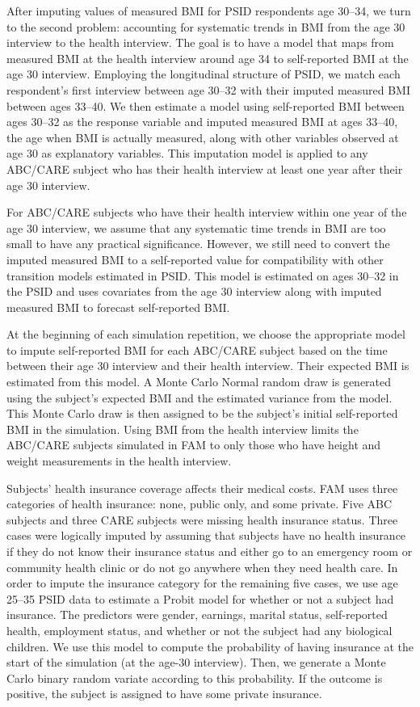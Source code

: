 \noindent After imputing values of measured BMI for PSID respondents age 30--34, we turn to the second problem: accounting for systematic trends in BMI from the age 30 interview to the health interview. The goal is to have a model that maps from measured BMI at the health interview around age 34 to self-reported BMI at the age 30 interview. Employing the longitudinal structure of PSID, we match each respondent's first interview between age 30--32 with their imputed measured BMI between ages 33--40. We then estimate a model using self-reported BMI between ages 30--32 as the response variable and imputed measured BMI at ages 33--40, the age when BMI is actually measured, along with other variables observed at age 30 as explanatory variables. This imputation model is applied to any ABC/CARE subject who has their health interview at least one year after their age 30 interview.

\noindent For ABC/CARE subjects who have their health interview within one year of the age 30 interview, we assume that any systematic time trends in BMI are too small to have any practical significance. However, we still need to convert the imputed measured BMI to a self-reported value for compatibility with other transition models estimated in PSID. This model is estimated on ages 30--32 in the PSID and uses covariates from the age 30 interview along with imputed measured BMI to forecast self-reported BMI.

\noindent At the beginning of each simulation repetition, we choose the appropriate model to impute self-reported BMI for each ABC/CARE subject based on the time between their age 30 interview and their health interview. Their expected BMI is estimated from this model. A Monte Carlo Normal random draw is generated using the subject's expected BMI and the estimated variance from the model. This Monte Carlo draw is then assigned to be the subject's initial self-reported BMI in the simulation. Using BMI from the health interview limits the ABC/CARE subjects simulated in FAM to only those who have height and weight measurements in the health interview.

\noindent Subjects' health insurance coverage affects their medical costs.
FAM uses three categories of health insurance: none, public only, and some private.
Five ABC subjects and three CARE subjects were missing health insurance status.
Three cases were logically imputed by assuming that subjects have no health insurance if they do not know their insurance status and either go to an emergency room or community health clinic or do not go anywhere when they need health care.
In order to impute the insurance category for the remaining five cases, we use age 25--35 PSID data to estimate a Probit model for whether or not a subject had insurance.
The predictors were gender, earnings, marital status, self-reported health, employment status, and whether or not the subject had any biological children.
We use this model to compute the probability of having insurance at the start of the simulation (at the age-30 interview).
Then, we generate a Monte Carlo binary random variate according to this probability.
If the outcome is positive, the subject is assigned to have some private insurance.

